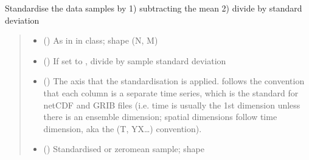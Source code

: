 \documentclass[letterpaper,10pt,english]{sphinxmanual}
\begin{document}

\begin{fulllineitems}
\label{\detokenize{misc:glomar_gridding.transformation.standardise_data}}
\pysigstartsignatures
\pysiglinewithargsret
{}
{\sphinxparamcomma {}\sphinxparamcomma {}}
{}
\pysigstopsignatures
\sphinxAtStartPar
Standardise the data samples by
1) subtracting the mean
2) divide by standard deviation
\begin{quote}\begin{description}
\begin{itemize}
\item {}
\sphinxAtStartPar
{} () \textendash{} As in  in  class;
shape (N, M)

\item {}
\sphinxAtStartPar
{} () \textendash{} If set to , divide by sample standard deviation

\item {}
\sphinxAtStartPar
{} () \textendash{} The axis that the standardisation is applied.
 follows the convention that each column
is a separate time series, which is the
standard for netCDF and GRIB files (i.e. time is usually
the 1st dimension unless there is an ensemble dimension;
spatial dimensions follow time dimension, aka the
(T, YX…) convention).

\end{itemize}

\sphinxAtStartPar
{}

\sphinxAtStartPar
\begin{itemize}
\item {}
\sphinxAtStartPar
{} () \textendash{} Standardised or zero\sphinxhyphen{}mean sample;
shape 


\end{itemize}
\end{description}
\end{quote}
\end{fulllineitems}
\end{document}

